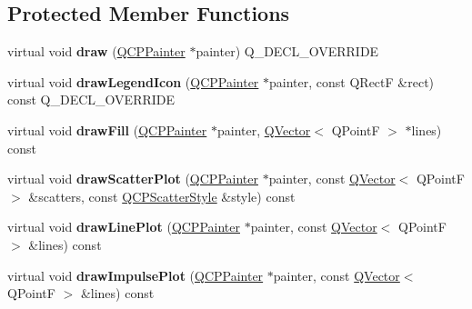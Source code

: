 \subsection*{Protected Member Functions}
\begin{DoxyCompactItemize}
\item 
virtual void {\bfseries draw} (\hyperlink{class_q_c_p_painter}{Q\+C\+P\+Painter} $\ast$painter) Q\+\_\+\+D\+E\+C\+L\+\_\+\+O\+V\+E\+R\+R\+I\+DE\hypertarget{class_q_c_p_graph_a2b0849598f06e834b43ce18cd13bcdc3}{}\label{class_q_c_p_graph_a2b0849598f06e834b43ce18cd13bcdc3}

\item 
virtual void {\bfseries draw\+Legend\+Icon} (\hyperlink{class_q_c_p_painter}{Q\+C\+P\+Painter} $\ast$painter, const Q\+RectF \&rect) const Q\+\_\+\+D\+E\+C\+L\+\_\+\+O\+V\+E\+R\+R\+I\+DE\hypertarget{class_q_c_p_graph_a6efbab06c400bdb15e28b2d0a4ecc18a}{}\label{class_q_c_p_graph_a6efbab06c400bdb15e28b2d0a4ecc18a}

\item 
virtual void {\bfseries draw\+Fill} (\hyperlink{class_q_c_p_painter}{Q\+C\+P\+Painter} $\ast$painter, \hyperlink{class_q_vector}{Q\+Vector}$<$ Q\+PointF $>$ $\ast$lines) const \hypertarget{class_q_c_p_graph_a81f56135cf16ee23af4e60bdd06a3331}{}\label{class_q_c_p_graph_a81f56135cf16ee23af4e60bdd06a3331}

\item 
virtual void {\bfseries draw\+Scatter\+Plot} (\hyperlink{class_q_c_p_painter}{Q\+C\+P\+Painter} $\ast$painter, const \hyperlink{class_q_vector}{Q\+Vector}$<$ Q\+PointF $>$ \&scatters, const \hyperlink{class_q_c_p_scatter_style}{Q\+C\+P\+Scatter\+Style} \&style) const \hypertarget{class_q_c_p_graph_a80031550e4809555b7bcbfeb3c7a1b07}{}\label{class_q_c_p_graph_a80031550e4809555b7bcbfeb3c7a1b07}

\item 
virtual void {\bfseries draw\+Line\+Plot} (\hyperlink{class_q_c_p_painter}{Q\+C\+P\+Painter} $\ast$painter, const \hyperlink{class_q_vector}{Q\+Vector}$<$ Q\+PointF $>$ \&lines) const \hypertarget{class_q_c_p_graph_a731d6e34e4987d1158f861036498bcab}{}\label{class_q_c_p_graph_a731d6e34e4987d1158f861036498bcab}

\item 
virtual void {\bfseries draw\+Impulse\+Plot} (\hyperlink{class_q_c_p_painter}{Q\+C\+P\+Painter} $\ast$painter, const \hyperlink{class_q_vector}{Q\+Vector}$<$ Q\+PointF $>$ \&lines) const \hypertarget{class_q_c_p_graph_a1b183c21190ab2beafcd917fbe5f24c8}{}\label{class_q_c_p_graph_a1b183c21190ab2beafcd917fbe5f24c8}


\end{DoxyCompactItemize}
